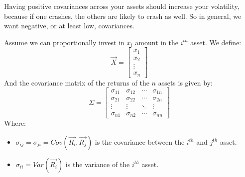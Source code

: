 \begin{lemma}
    Having positive covariances across your assets should increase your volatility, because if one crashes, the others are likely to crash as well. So in general, we want negative, or at least low, covariances.\\
\end{lemma}

\begin{definition}
    Assume we can proportionally invest in $x_i$ amount in the $i^{th}$ asset. We define:
    \begin{equation}
        \overrightarrow{X} = \begin{bmatrix}
            x_1    \\
            x_2    \\
            \vdots \\
            x_n
        \end{bmatrix}
    \end{equation}
    And the covariance matrix of the returns of the $n$ assets is given by:
    \begin{equation}
        \Sigma = \begin{bmatrix}
            \sigma_{11} & \sigma_{12} & \cdots & \sigma_{1n} \\
            \sigma_{21} & \sigma_{22} & \cdots & \sigma_{2n} \\
            \vdots      & \vdots      & \ddots & \vdots      \\
            \sigma_{n1} & \sigma_{n2} & \cdots & \sigma_{nn}
        \end{bmatrix}
    \end{equation}
    Where:
    \begin{itemize}
        \item $\sigma_{ij} = \sigma_{ji} = Cov(\overrightarrow{R_i},\overrightarrow{R_j})  $ is the covariance between the $i^{th}$ and $j^{th}$ asset.
        \item $\sigma_{ii} = Var(\overrightarrow{R_i})$ is the variance of the $i^{th}$ asset.
    \end{itemize}
\end{definition}


